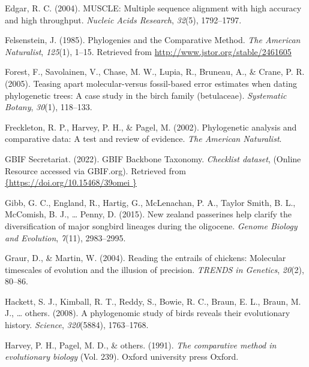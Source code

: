 \documentclass[english,man]{apa6}
\begin{document}
\leavevmode\hypertarget{ref-edgar2004muscle}{}%
Edgar, R. C. (2004). MUSCLE: Multiple sequence alignment with high accuracy and high throughput. \emph{Nucleic Acids Research}, \emph{32}(5), 1792--1797.

\leavevmode\hypertarget{ref-Felsenstein1985a}{}%
Felsenstein, J. (1985). Phylogenies and the Comparative Method. \emph{The American Naturalist}, \emph{125}(1), 1--15. Retrieved from \url{http://www.jstor.org/stable/2461605}

\leavevmode\hypertarget{ref-forest2005teasing}{}%
Forest, F., Savolainen, V., Chase, M. W., Lupia, R., Bruneau, A., \& Crane, P. R. (2005). Teasing apart molecular-versus fossil-based error estimates when dating phylogenetic trees: A case study in the birch family (betulaceae). \emph{Systematic Botany}, \emph{30}(1), 118--133.

\leavevmode\hypertarget{ref-freckleton2002phylogenetic}{}%
Freckleton, R. P., Harvey, P. H., \& Pagel, M. (2002). Phylogenetic analysis and comparative data: A test and review of evidence. \emph{The American Naturalist}.

\leavevmode\hypertarget{ref-gbif2022taxonomy}{}%
GBIF Secretariat. (2022). GBIF Backbone Taxonomy. \emph{Checklist dataset}, (Online Resource accessed via GBIF.org). Retrieved from \href{\%7Bhttps://doi.org/10.15468/39omei\%20\%7D}{\{https://doi.org/10.15468/39omei \}}

\leavevmode\hypertarget{ref-gibb2015new}{}%
Gibb, G. C., England, R., Hartig, G., McLenachan, P. A., Taylor Smith, B. L., McComish, B. J., \ldots{} Penny, D. (2015). New zealand passerines help clarify the diversification of major songbird lineages during the oligocene. \emph{Genome Biology and Evolution}, \emph{7}(11), 2983--2995.

\leavevmode\hypertarget{ref-graur2004reading}{}%
Graur, D., \& Martin, W. (2004). Reading the entrails of chickens: Molecular timescales of evolution and the illusion of precision. \emph{TRENDS in Genetics}, \emph{20}(2), 80--86.

\leavevmode\hypertarget{ref-hackett2008phylogenomic}{}%
Hackett, S. J., Kimball, R. T., Reddy, S., Bowie, R. C., Braun, E. L., Braun, M. J., \ldots{} others. (2008). A phylogenomic study of birds reveals their evolutionary history. \emph{Science}, \emph{320}(5884), 1763--1768.

\leavevmode\hypertarget{ref-harvey1991comparative}{}%
Harvey, P. H., Pagel, M. D., \& others. (1991). \emph{The comparative method in evolutionary biology} (Vol. 239). Oxford university press Oxford.
\end{document}
